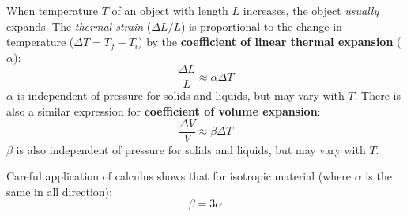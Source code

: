 When temperature $T$ of an object with length $L$ increases, the object
\emph{usually} expands. The \emph{thermal strain} ($\Delta L/L$) is
proportional to the change in temperature ($\Delta T=T_f-T_i$) by the
\textbf{coefficient of linear thermal expansion} ($\alpha$):
\begin{equation}
  \boxed{
    \frac{\Delta L}L\approx\alpha\Delta T
  }
\end{equation}
$\alpha$ is independent of pressure for solids and liquids, but may vary
with $T$.
%
%
%
%
There is also a similar expression for \textbf{coefficient of volume expansion}:
\begin{equation}
  \boxed{\frac{\Delta V}V\approx\beta\Delta T}
\end{equation}
$\beta$ is also independent of pressure for solids and liquids, but may vary
with $T$.

Careful application of calculus shows that for isotropic material (where
$\alpha$ is the same in all direction):
\begin{equation}
  \beta = 3\alpha
\end{equation}



